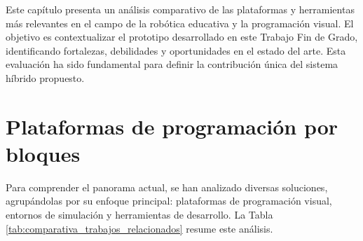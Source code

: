 
Este capítulo presenta un análisis comparativo de las plataformas y herramientas más relevantes en el campo de la robótica educativa y la programación visual. El objetivo es contextualizar el prototipo desarrollado en este Trabajo Fin de Grado, identificando fortalezas, debilidades y oportunidades en el estado del arte. Esta evaluación ha sido fundamental para definir la contribución única del sistema híbrido propuesto.

\section{Plataformas de programación por bloques}
Para comprender el panorama actual, se han analizado diversas soluciones, agrupándolas por su enfoque principal: plataformas de programación visual, entornos de simulación y herramientas de desarrollo. La Tabla \ref{tab:comparativa_trabajos_relacionados} resume este análisis.

